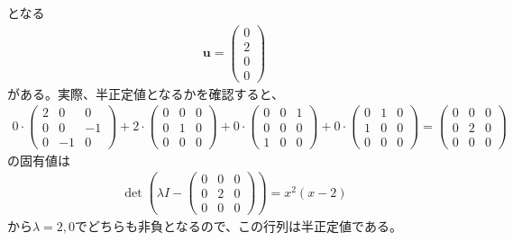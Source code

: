 となる
\begin{align*}
  \mathbf{u} = \left(
                 \begin{array}{c}
                   0 \\
                   2 \\
                   0 \\
                   0
                 \end{array}
               \right)
\end{align*}
がある。実際、半正定値となるかを確認すると、
\begin{align*}
    0 \cdot \left(
              \begin{array}{ccc}
                2 &  0 &  0 \\
                0 &  0 & -1 \\
                0 & -1 &  0
              \end{array}
            \right)
  + 2 \cdot \left(
              \begin{array}{ccc}
                0 & 0 & 0 \\
                0 & 1 & 0 \\
                0 & 0 & 0
              \end{array}
            \right)
  + 0 \cdot \left(
              \begin{array}{ccc}
                0 & 0 & 1 \\
                0 & 0 & 0 \\
                1 & 0 & 0
              \end{array}
            \right)
  + 0 \cdot \left(
              \begin{array}{ccc}
                0 & 1 & 0 \\
                1 & 0 & 0 \\
                0 & 0 & 0
              \end{array}
            \right)
  = \left(
      \begin{array}{ccc}
        0 & 0 & 0 \\
        0 & 2 & 0 \\
        0 & 0 & 0
      \end{array}
    \right)
\end{align*}
の固有値は
\begin{align*}
  \det \left(\lambda I - \left(\begin{array}{ccc} 0 & 0 & 0 \\ 0 & 2 & 0 \\ 0 & 0 & 0\end{array}\right)\right) = x^2 \left(x - 2\right)
\end{align*}
から$\lambda = 2, 0$でどちらも非負となるので、この行列は半正定値である。

